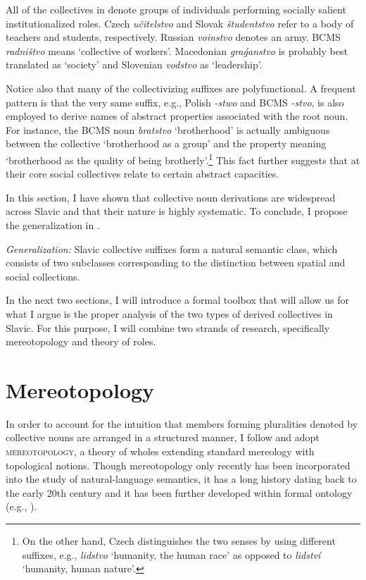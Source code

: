 \documentclass[output=paper]{langscibook}
\begin{document}
All of the collectives in  denote groups of individuals performing socially salient institutionalized roles. Czech \textit{učitelstvo} and Slovak \textit{študentstvo} refer to a body of teachers and students, respectively. Russian \textit{voinstvo} denotes an army. BCMS \textit{radništvo} means `collective of workers'. Macedonian \textit{gra{\'{g}}anstvo} is probably best translated as `society' and Slovenian \textit{vodstvo} as `leadership'.\largerpage

Notice also that many of the collectivizing suffixes are polyfunctional. A frequent pattern is that the very same suffix, e.g., Polish \textit{-stwo} and BCMS \textit{-stvo}, is also employed to derive names of abstract properties associated with the root noun. For instance, the BCMS noun \textit{bratstvo} `brotherhood' is actually ambiguous between the collective `brotherhood as a group' and the property meaning `brotherhood as the quality of being brotherly'.\footnote{On the other hand, Czech distinguishes the two senses by using different suffixes, e.g., \textit{lidstvo} `humanity, the human race' as opposed to \textit{lidství} `humanity, human nature'.} This fact further suggests that at their core social collectives relate to certain abstract capacities.

In this section, I have shown that collective noun derivations are widespread across Slavic and that their nature is highly systematic. To conclude, I propose the generalization in .

\eanoraggedright\sloppy \textit{Generalization:} Slavic collective suffixes form a natural semantic class, which consists of two subclasses corresponding to the distinction between spatial and social collections.\label{wan:ex:generalization}
\z

\noindent In the next two sections, I will introduce a formal toolbox that will allow us for what I argue is the proper analysis of the two types of derived collectives in Slavic. For this purpose, I will combine two strands of research, specifically mereotopology and theory of roles.  

\section{Mereotopology}\label{wan:sec:mereotopology}

In order to account for the intuition that members forming pluralities denoted by collective nouns are arranged in a structured manner, I follow \citet{grimm2012number} and adopt \textsc{mereotopology}, a theory of wholes extending standard mereology with topological notions. Though mereotopology only recently has been incorporated into the study of natural-language semantics, it has a long history dating back to the early 20th century \citep{whitehead1920concept} and it has been further developed within formal ontology (e.g., \citealt{smith1996mereotopology,casati_varzi1999parts,varzi2007spatial}).
\end{document}
